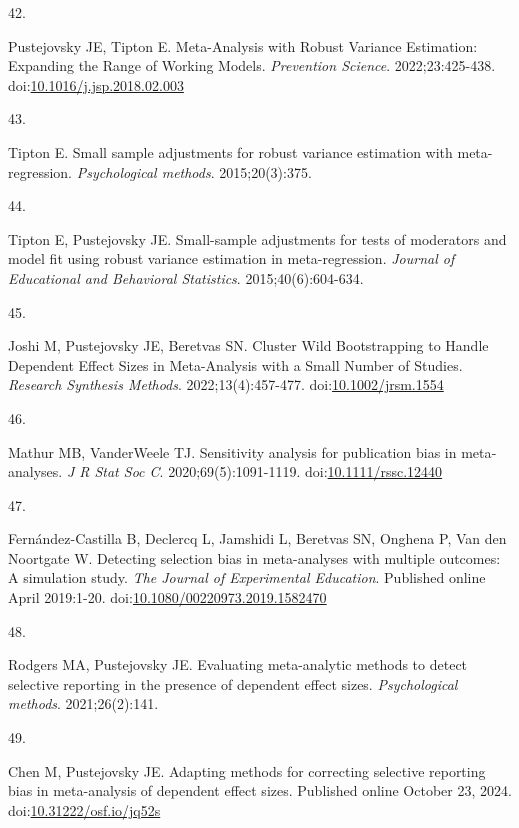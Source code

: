 \documentclass[
  american,
  man, donotrepeattitle,floatsintext]{apa7}
\newlength{\cslhangindent}
\newlength{\csllabelwidth}
\newenvironment{CSLReferences}[2] %
 {\begin{list}{}{%
  \setlength{\itemindent}{0pt}
  \setlength{\leftmargin}{0pt}
  \setlength{\parsep}{0pt}
  \ifodd #1
   \setlength{\leftmargin}{\cslhangindent}
   \setlength{\itemindent}{-1\cslhangindent}
  \fi
  \setlength{\itemsep}{#2\baselineskip}}}
 {\end{list}}
\newcommand{\CSLLeftMargin}[1]{\parbox[t]{\csllabelwidth}{\strut#1\strut}}
\newcommand{\CSLRightInline}[1]{\parbox[t]{\linewidth - \csllabelwidth}{\strut#1\strut}}
\begin{document}
\begin{CSLReferences}{0}{1}
\CSLLeftMargin{42. }%
\CSLRightInline{Pustejovsky JE, Tipton E. Meta-Analysis with Robust Variance Estimation: {Expanding} the Range of Working Models. \emph{Prevention Science}. 2022;23:425-438. doi:\href{https://doi.org/10.1016/j.jsp.2018.02.003}{10.1016/j.jsp.2018.02.003}}

\CSLLeftMargin{43. }%
\CSLRightInline{Tipton E. Small sample adjustments for robust variance estimation with meta-regression. \emph{Psychological methods}. 2015;20(3):375.}

\CSLLeftMargin{44. }%
\CSLRightInline{Tipton E, Pustejovsky JE. Small-sample adjustments for tests of moderators and model fit using robust variance estimation in meta-regression. \emph{Journal of Educational and Behavioral Statistics}. 2015;40(6):604-634.}

\CSLLeftMargin{45. }%
\CSLRightInline{Joshi M, Pustejovsky JE, Beretvas SN. Cluster Wild Bootstrapping to Handle Dependent Effect Sizes in Meta-Analysis with a Small Number of Studies. \emph{Research Synthesis Methods}. 2022;13(4):457-477. doi:\href{https://doi.org/10.1002/jrsm.1554}{10.1002/jrsm.1554}}

\CSLLeftMargin{46. }%
\CSLRightInline{Mathur MB, VanderWeele TJ. Sensitivity analysis for publication bias in meta‐analyses. \emph{J R Stat Soc C}. 2020;69(5):1091-1119. doi:\href{https://doi.org/10.1111/rssc.12440}{10.1111/rssc.12440}}

\CSLLeftMargin{47. }%
\CSLRightInline{Fernández-Castilla B, Declercq L, Jamshidi L, Beretvas SN, Onghena P, Van den Noortgate W. Detecting selection bias in meta-analyses with multiple outcomes: A simulation study. \emph{The Journal of Experimental Education}. Published online April 2019:1-20. doi:\href{https://doi.org/10.1080/00220973.2019.1582470}{10.1080/00220973.2019.1582470}}

\CSLLeftMargin{48. }%
\CSLRightInline{Rodgers MA, Pustejovsky JE. Evaluating meta-analytic methods to detect selective reporting in the presence of dependent effect sizes. \emph{Psychological methods}. 2021;26(2):141.}

\CSLLeftMargin{49. }%
\CSLRightInline{Chen M, Pustejovsky JE. Adapting methods for correcting selective reporting bias in meta-analysis of dependent effect sizes. Published online October 23, 2024. doi:\href{https://doi.org/10.31222/osf.io/jq52s}{10.31222/osf.io/jq52s}}


\end{CSLReferences}
\end{document}

